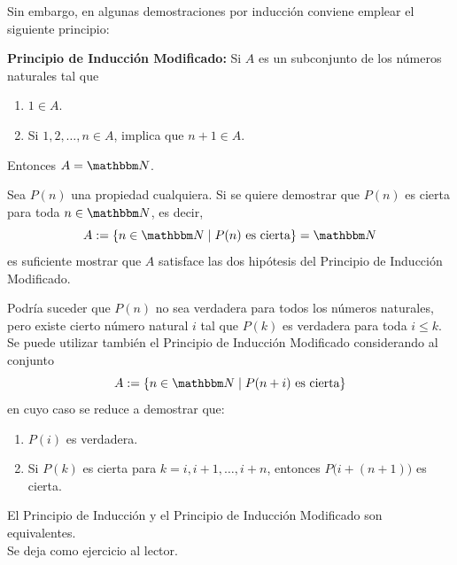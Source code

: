 
Sin embargo, en algunas demostraciones por inducción conviene emplear el siguiente principio:

\noindent\textbf{Principio de Inducción Modificado:} Si $A$ es un subconjunto de los números naturales tal que
\begin{enumerate}[label=\roman*.]
    \item $1 \in A$.
    \item Si $1, 2, \dots , n \in A$, implica que $n+1 \in A$.
\end{enumerate}
    Entonces $A=\NN$.

\begin{observation}
    Sea $P(n)$ una propiedad cualquiera. Si se quiere demostrar que $P(n)$ es cierta para toda $n \in \NN$, es decir,
    $$A:=\left\lbrace n \in \NN \mid P(n) \text{ es cierta} \right\rbrace = \NN$$
    es suficiente mostrar que $A$ satisface las dos hipótesis del Principio de Inducción Modificado.
\end{observation}

\begin{observation}
    Podría suceder que $P(n)$ no sea verdadera para todos los números naturales, pero existe cierto número natural $i$ tal que $P(k)$ es verdadera para toda $i \leq k$. Se puede utilizar también el Principio de Inducción Modificado considerando al conjunto
    $$A:=\left\lbrace n \in \NN \mid P(n+i) \text{ es cierta} \right\rbrace $$
    en cuyo caso se reduce a demostrar que:
    \begin{enumerate}[label=\roman*.]
        \item $P(i)$ es verdadera.
        \item Si $P(k)$ es cierta para $k=i, i+1, \dots, i+n$, entonces $P\big( i+(n+1) \big)$ es cierta.
    \end{enumerate}
\end{observation}

\begin{proposition}
    El Principio de Inducción y el Principio de Inducción Modificado son equivalentes. \\
    \demostracion Se deja como ejercicio al lector.
\end{proposition}

\newpage

